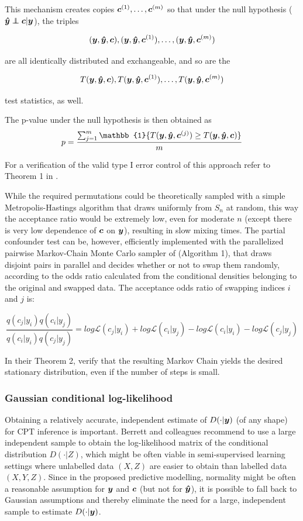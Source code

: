 \documentclass{article}
\begin{document}
This mechanism creates copies $\boldsymbol{c}^{(1)}, \dots ,\boldsymbol{c}^{(m)}$ so that under the null hypothesis ($\yhat \independent \c | \y$), the triples 

$$(\boldsymbol{y},\boldsymbol{\hat{y}},\boldsymbol{c}), (\boldsymbol{y}, \boldsymbol{\hat{y}}, \boldsymbol{c}^{(1)}),\dots, (\boldsymbol{y}, \boldsymbol{\hat{y}}, \boldsymbol{c}^{(m)})$$

are all identically distributed and exchangeable, and so are the 

$$T(\boldsymbol{y},\boldsymbol{\hat{y}},\boldsymbol{c}), T(\boldsymbol{y}, \boldsymbol{\hat{y}}, \boldsymbol{c}^{(1)}),\dots,T(\boldsymbol{y}, \boldsymbol{\hat{y}}, \boldsymbol{c}^{(m)})$$

test statistics, as well.

The p-value under the null hypothesis is then obtained as
$$ p= \frac{\sum_{j=1}^m \mathbb{1} \{T(\y, \yhat, \c^{(j)}) \geq T(\y, \yhat, \c) \}  }{m}$$

For a verification of the valid type I error control of this approach refer to Theorem 1 in \citep{berrett2020conditional}.

While the required permutations could be theoretically sampled with a simple Metropolis-Hastings algorithm that draws uniformly from $S_n$ at random, this way the acceptance ratio would be extremely low, even for moderate $n$ (except there is very low dependence of $\boldsymbol{c}$ on $\boldsymbol{y}$), resulting in slow mixing times. The partial confounder test can be, however, efficiently implemented with the parallelized pairwise Markov-Chain Monte Carlo sampler of \cite{berrett2020conditional} (Algorithm 1), that draws disjoint pairs in parallel and decides whether or not to swap them randomly, according to the odds ratio calculated from the conditional densities belonging to the original and swapped data. The acceptance odds ratio of swapping indices $i$ and $j$ is:

\begin{equation}
\frac{ q(c_j | y_i) q(c_i | y_j)}{q(c_i | y_i) q(c_j | y_j) }
=
log \mathcal{L}(c_j | y_i) + log \mathcal{L}(c_i | y_j) - log \mathcal{L}(c_i | y_i) - log \mathcal{L}(c_j | y_j) 
\label{eq:accept-odds}
\end{equation}

In their Theorem 2, \cite{berrett2020conditional} verify that the resulting Markov Chain yields the desired stationary distribution, even if the number of steps is small.

\subsubsection*{Gaussian conditional log-likelihood}


Obtaining a relatively accurate, independent estimate of $D(\cdot|\boldsymbol{y})$ (of any shape) for CPT inference is important. Berrett and colleagues recommend to use a large independent sample to obtain the log-likelihood matrix of the conditional distribution $D(\cdot|Z)$, which might be often viable in semi-supervised learning settings where unlabelled data $(X, Z)$ are easier to obtain than labelled data $(X, Y, Z)$.
Since in the proposed predictive modelling, normality might be often a reasonable assumption for $\boldsymbol{y}$ and $\boldsymbol{c}$ (but not for $\boldsymbol{\hat{y}}$), it is possible to fall back to Gaussian assumptions and thereby eliminate the need for a large, independent sample to estimate $D(\cdot|\boldsymbol{y})$.
\end{document}

